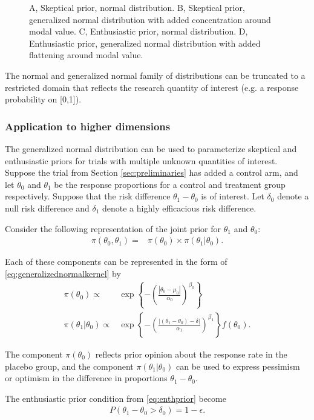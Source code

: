 \documentclass[12pt]{article}
\begin{document}
\begin{figure}
\begin{center}
\caption{A, Skeptical prior, normal distribution. B, Skeptical prior, generalized normal distribution with added concentration around modal value. C, Enthusiastic prior, normal distribution. D, Enthusiastic prior, generalized normal distribution with added flattening around modal value.}
\label{fig:figure1}
\end{center}\end{figure}

The normal and generalized normal family of distributions can be truncated to a restricted domain that reflects the research quantity of interest (e.g. a response probability on [0,1]).
\subsubsection{Application to higher dimensions}
The generalized normal distribution can be used to parameterize skeptical and enthusiastic priors for trials with multiple unknown quantities of interest. Suppose the trial from Section \ref{sec:preliminaries} has added a control arm, and let $\theta_0$ and $\theta_1$ be the response proportions for a control and treatment group respectively. Suppose that the risk difference $\theta_1-\theta_0$ is of interest. Let $\delta_0$ denote a null risk difference and $\delta_1$ denote a highly efficacious risk difference.

Consider the following representation of the joint prior for $\theta_1$ and $\theta_0$:
\begin{align}
\pi(\theta_0,\theta_1)=&\pi(\theta_0)\times\pi(\theta_1|\theta_0). \label{eq:generalized_normal_joint}
\end{align}

Each of these components can be represented in the form of \eqref{eq:generalizednormalkernel} by
\begin{align}
\pi(\theta_0)\propto&\exp\left\{-\left(\frac{|\theta_0-\mu_0|}{\alpha_0}\right)^{\beta_0}\right\} \label{eq:genNormPlacebo}\\
\pi(\theta_1|\theta_0)\propto&\exp\left\{-\left(\frac{|(\theta_1-\theta_0)-\delta|}{\alpha_1}\right)^{\beta_1}\right\}f(\theta_0). \label{eq:genNormRd}
\end{align}

The component $\pi(\theta_0)$ reflects prior opinion about the response rate in the placebo group, and the component $\pi(\theta_1|\theta_0)$ can be used to express pessimism or optimism in the difference in proportions $\theta_1 - \theta_0$. 

The enthusiastic prior condition from \eqref{eq:enthprior} become
\begin{align}\label{eq:ex2enthcondition}
P(\theta_1-\theta_0>\delta_0)=1-\epsilon.
\end{align}
\end{document}
